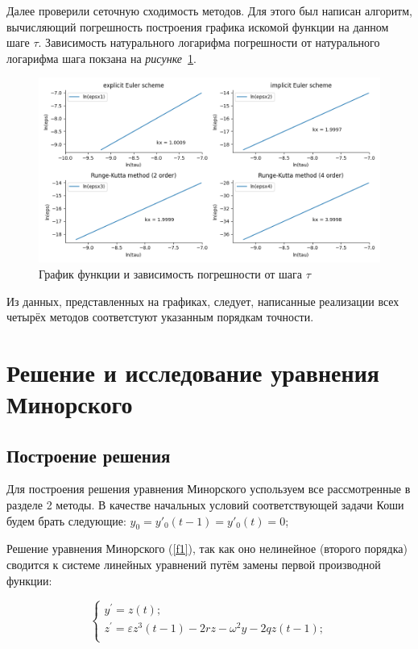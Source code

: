\documentclass[a4paper,12pt]{article}
\begin{document}
  	Далее проверили сеточную сходимость методов. Для этого был 
	написан алгоритм, вычисляющий погрешность построения графика 
	искомой функции на данном шаге $\tau$. Зависимость натурального 
	логарифма погрешности от натурального логарифма шага покзана на 
	\textit{рисунке}~\ref{fig:fig2}.

	\begin{figure}[ht!]
		\begin{center}
		\includegraphics[scale=0.43]{figures/test_2.png}
		\end{center}
		\vspace*{-8mm}
		\caption{График функции и зависимость погрешности от шага $\tau$}\label{fig:fig2}
  	\end{figure}

	Из данных, представленных на графиках, следует, написанные реализации всех 
	четырёх методов соответстуют указанным порядкам точности.

	\section{Решение и исследование уравнения Минорского}
	\subsection{Построение решения}
	Для построения решения уравнения Минорского успользуем все 
	рассмотренные в разделе 2 методы. В качестве начальных условий 
	соответствующей задачи Коши будем брать следующие:	
	$y_0 = y'_0(t-1) = y'_0(t) = 0$;

	Решение уравнения Минорского (\ref{f1}), так как оно нелинейное (второго порядка) 
	сводится к системе линейных уравнений путём замены первой производной функции:
	
	\begin{equation}
		\begin{cases}
			y^\prime = z(t); \\
			z^\prime = \varepsilon z^3(t-1) - 2rz - \omega^2 y - 2q z(t-1);\\
		\end{cases}
		\label{cs1}
	\end{equation}
\end{document}
